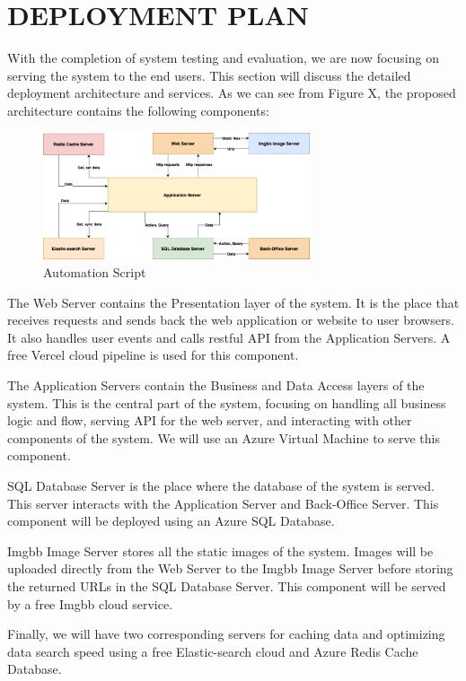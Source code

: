 \chapter{DEPLOYMENT PLAN} 
With the completion of system testing and evaluation, we are now 
focusing on serving the system to the end users. This section will 
discuss the detailed deployment architecture and services. As we 
can see from Figure X, the proposed architecture contains the 
following components:
\begin{figure}[H]
    \centering
    \includegraphics[width=0.7\textwidth]{Figures/Deployment/Pattern and Architecture-Deployment.drawio.png}
    \caption{Automation Script}
    \label{fig:cypress-script}
\end{figure}
The Web Server contains the Presentation layer of the system. It is the place that receives requests and sends 
back the web application or website to user browsers. It also 
handles user events and calls restful API from the Application 
Servers. A free Vercel cloud pipeline is used for this component.

The Application Servers contain the Business and Data Access layers 
of the system. This is the central part of the system, focusing on 
handling all business logic and flow, serving API for the web server, 
and interacting with other components of the system. We will use an Azure 
Virtual Machine to serve this component.

SQL Database Server is the place where the database of the system is served. 
This server interacts with the Application Server and Back-Office Server. 
This component will be deployed using an Azure SQL Database.

Imgbb Image Server stores all the static images of the system. Images will 
be uploaded directly from the Web Server to the Imgbb Image Server before 
storing the returned URLs in the SQL Database Server. This component will 
be served by a free Imgbb cloud service.

Finally, we will have two corresponding servers for caching data and optimizing 
data search speed using a free Elastic-search cloud and Azure Redis Cache Database.
